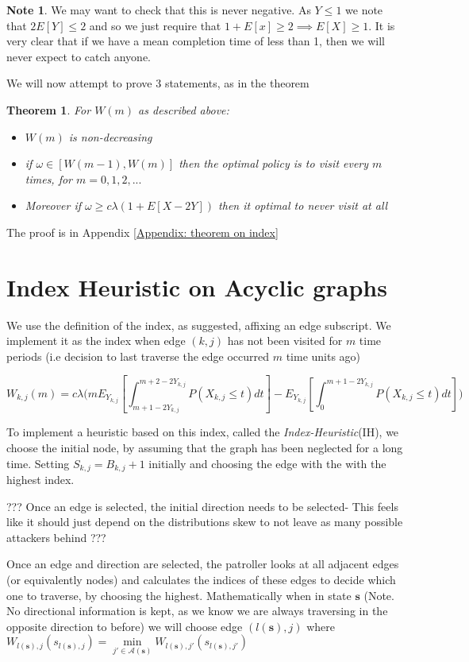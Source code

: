 \documentclass[a4paper,10pt]{article}
\newtheorem{theorem}{Theorem}[section]
\theoremstyle{definition}
\theoremstyle{definition}
\theoremstyle{remark}
\theoremstyle{definition}
\newtheorem*{note}{Note}
\begin{document}
\begin{note}
We may want to check that this is never negative. As $Y \leq 1$ we note that $2E[Y] \leq 2$ and so we just require that $1+E[x] \geq 2 \implies E[X] \geq 1$. It is very clear that if we have a mean completion time of less than 1, then we will never expect to catch anyone.
\end{note}

We will now attempt to prove 3 statements, as in the theorem

\begin{theorem}
For $W(m)$ as described above:
\begin{itemize}
\item $W(m)$ is non-decreasing
\item if $\omega \in [W(m-1),W(m)]$ then the optimal policy is to visit every $m$ times, for $m=0,1,2,...$
\item Moreover if $\omega \geq c \lambda (1+E[X-2Y])$ then it optimal to never visit at all
\end{itemize}
\end{theorem}
The proof is in Appendix \ref{Appendix: theorem on index}

\section{Index Heuristic on Acyclic graphs}
We use the definition of the index, as suggested, affixing an edge subscript. We implement it as the index when edge $(k,j)$ has not been visited for $m$ time periods (i.e decision to last traverse the edge occurred $m$ time units ago)

\begin{equation}
W_{k,j}(m)=c \lambda \Bigg(mE_{Y_{k,j}} \left[\int_{m+1-2Y_{k,j}}^{m+2-2Y_{k,j}} P(X_{k,j} \leq t) dt \right] - E_{Y_{k,j}} \left[\int_{0}^{m+1-2Y_{k,j}} P(X_{k,j} \leq t) dt \right] \Bigg)
\end{equation}

To implement a heuristic based on this index, called the \textit{Index-Heuristic}(IH), we choose the initial node, by assuming that the graph has been neglected for a long time. Setting $S_{k,j}=B_{k,j}+1$ initially and choosing the edge with the with the highest index.

??? Once an edge is selected, the initial direction needs to be selected- This feels like it should just depend on the distributions skew to not leave as many possible attackers behind ???

Once an edge and direction are selected, the patroller looks at all adjacent edges (or equivalently nodes) and calculates the indices of these edges to decide which one to traverse, by choosing the highest. Mathematically when in state $\bm{s}$ (Note. No directional information is kept, as we know we are always traversing in the opposite direction to before) we will choose edge $(l(\bm{s}),j)$ where $W_{l(\bm{s}),j}(s_{l(\bm{s}),j})=\min\limits_{j' \in \mathcal{A}(\bm{s})} W_{l(\bm{s}),j'}(s_{l(\bm{s}),j'})$
\end{document}
